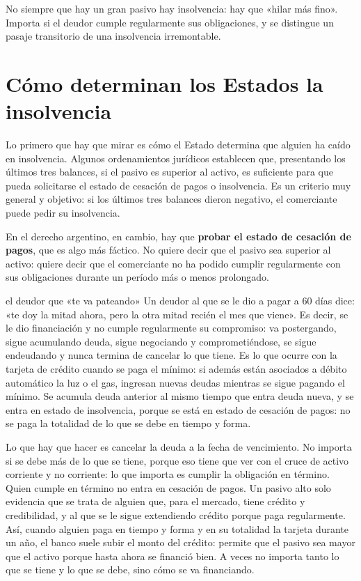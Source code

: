 \documentclass[12pt,oneside]{book}
\begin{document}
\begin{important}
No siempre que hay un gran pasivo hay insolvencia: hay que «hilar más fino». Importa si el deudor cumple regularmente sus obligaciones, y se distingue un pasaje transitorio de una insolvencia irremontable.
\end{important}

\section{Cómo determinan los Estados la insolvencia}

Lo primero que hay que mirar es cómo el Estado determina que alguien ha caído en insolvencia. Algunos ordenamientos jurídicos establecen que, presentando los últimos tres balances, si el pasivo es superior al activo, es suficiente para que pueda solicitarse el estado de cesación de pagos o insolvencia. Es un criterio muy general y objetivo: si los últimos tres balances dieron negativo, el comerciante puede pedir su insolvencia.

En el derecho argentino, en cambio, hay que \textbf{probar el estado de cesación de pagos}, que es algo más fáctico. No quiere decir que el pasivo sea superior al activo: quiere decir que el comerciante no ha podido cumplir regularmente con sus obligaciones durante un período más o menos prolongado.

\begin{example}{el deudor que «te va pateando»}
Un deudor al que se le dio a pagar a 60 días dice: «te doy la mitad ahora, pero la otra mitad recién el mes que viene». Es decir, se le dio financiación y no cumple regularmente su compromiso: va postergando, sigue acumulando deuda, sigue negociando y comprometiéndose, se sigue endeudando y nunca termina de cancelar lo que tiene. Es lo que ocurre con la tarjeta de crédito cuando se paga el mínimo: si además están asociados a débito automático la luz o el gas, ingresan nuevas deudas mientras se sigue pagando el mínimo. Se acumula deuda anterior al mismo tiempo que entra deuda nueva, y se entra en estado de insolvencia, porque se está en estado de cesación de pagos: no se paga la totalidad de lo que se debe en tiempo y forma.
\end{example}

Lo que hay que hacer es cancelar la deuda a la fecha de vencimiento. No importa si se debe más de lo que se tiene, porque eso tiene que ver con el cruce de activo corriente y no corriente: lo que importa es cumplir la obligación en término. Quien cumple en término no entra en cesación de pagos. Un pasivo alto solo evidencia que se trata de alguien que, para el mercado, tiene crédito y credibilidad, y al que se le sigue extendiendo crédito porque paga regularmente. Así, cuando alguien paga en tiempo y forma y en su totalidad la tarjeta durante un año, el banco suele subir el monto del crédito: permite que el pasivo sea mayor que el activo porque hasta ahora se financió bien. A veces no importa tanto lo que se tiene y lo que se debe, sino cómo se va financiando.
\end{document}
